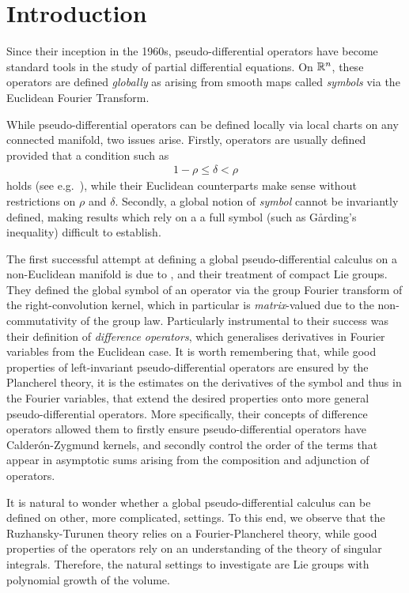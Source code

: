 \chapter{Introduction}

Since their inception in the 1960s,
pseudo-differential operators have become standard tools in the study of partial differential equations.
On $\mathbb{R}^n$,
these operators are defined \emph{globally} as arising from smooth maps called \emph{symbols} via the Euclidean Fourier Transform.

While pseudo-differential operators can be defined locally via local charts on any connected manifold,
two issues arise.
Firstly,
operators are usually defined provided that a condition such as
\begin{align*}
    1 - \rho \leq \delta < \rho
\end{align*}
holds (see e.g.~\cite[Section 4]{Shubin01}),
while their Euclidean counterparts make sense without restrictions on $\rho$ and $\delta$.
Secondly,
a global notion of \emph{symbol} cannot be invariantly defined,
making results which rely on a a full symbol (such as Gårding's inequality) difficult to establish.

The first successful attempt at defining a global pseudo-differential calculus
on a non-Euclidean manifold is due to \citeauthor{RuzhanskyTurunen10},
and their treatment of compact Lie groups.
They defined the global symbol of an operator via the group Fourier transform of the right-convolution kernel,
which in particular is  \emph{matrix}-valued
due to the non-commutativity of the group law.
Particularly instrumental to their success was their definition of \emph{difference operators},
which generalises derivatives in Fourier variables from the Euclidean case.
It is worth remembering that,
while good properties of left-invariant pseudo-differential operators
are ensured by the Plancherel theory,
it is the estimates on the derivatives of the symbol and thus in the Fourier variables,
that extend the desired properties onto more general pseudo-differential operators.
More specifically,
their concepts of difference operators allowed them to firstly ensure pseudo-differential operators
have Calder\'on-Zygmund kernels,
and secondly control the order of the terms that appear in asymptotic sums
arising from the composition and adjunction of operators.

It is natural to wonder whether a global pseudo-differential calculus can be defined on other,
more complicated, settings.
To this end,
we observe that the Ruzhansky-Turunen theory relies on a Fourier-Plancherel theory,
while good properties of the operators rely on an understanding of the theory of singular integrals.
Therefore,
the natural settings to investigate are Lie groups with polynomial growth of the volume.


